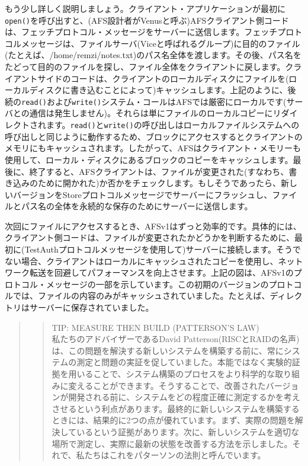 もう少し詳しく説明しましょう。クライアント・アプリケーションが最初に\texttt{open()}を呼び出すと、(AFS設計者がVenusと呼ぶ)AFSクライアント側コードは、フェッチプロトコル・メッセージをサーバーに送信します。フェッチプロトコルメッセージは、ファイルサーバ(Viceと呼ばれるグループ)に目的のファイル(たとえば、/home/remzi/notes.txt)のパス名全体を渡します。その後、パス名をたどって目的のファイルを探し、ファイル全体をクライアントに戻します。クライアントサイドのコードは、クライアントのローカルディスクにファイルを(ローカルディスクに書き込むことによって)キャッシュします。上記のように、後続の\texttt{read()}および\texttt{write()}システム・コールはAFSでは厳密にローカルです(サーバとの通信は発生しません)。それらは単にファイルのローカルコピーにリダイレクトされます。\texttt{read()}と\texttt{write()}の呼び出しはローカルファイルシステムへの呼び出しと同じように動作するため、ブロックにアクセスするとクライアントのメモリにもキャッシュされます。したがって、AFSはクライアント・メモリーも使用して、ローカル・ディスクにあるブロックのコピーをキャッシュします。最後に、終了すると、AFSクライアントは、ファイルが変更された(すなわち、書き込みのために開かれた)か否かをチェックします。もしそうであったら、新しいバージョンをStoreプロトコルメッセージでサーバーにフラッシュし、ファイルとパス名の全体を永続的な保存のためにサーバーに送信します。

次回にファイルにアクセスするとき、AFSv1はずっと効率的です。具体的には、クライアント側コードは、ファイルが変更されたかどうかを判断するために、最初に(TestAuthプロトコルメッセージを使用して)サーバーに接続します。そうでない場合、クライアントはローカルにキャッシュされたコピーを使用し、ネットワーク転送を回避してパフォーマンスを向上させます。上記の図は、AFSv1のプロトコル・メッセージの一部を示しています。この初期のバージョンのプロトコルでは、ファイルの内容のみがキャッシュされていました。たとえば、ディレクトリはサーバーに保存されていました。

\begin{quote}
\begin{quote}
TIP: MEASURE THEN BUILD (PATTERSON'S LAW)\\
私たちのアドバイザーであるDavid
Patterson(RISCとRAIDの名声)は、この問題を解決する新しいシステムを構築する前に、常にシステムの測定と問題の実証を促していました。本能ではなく実験的証拠を用いることで、システム構築のプロセスをより科学的な取り組みに変えることができます。そうすることで、改善されたバージョンが開発される前に、システムをどの程度正確に測定するかを考えさせるという利点があります。最終的に新しいシステムを構築するときには、結果的に2つの点が優れています。まず、実際の問題を解決しているという証拠があります。次に、新しいシステムを適切な場所で測定し、実際に最新の状態を改善する方法を示しました。それで、私たちはこれをパターソンの法則と呼んでいます。
\end{quote}
\end{quote}

